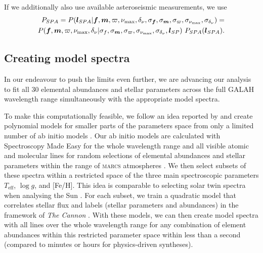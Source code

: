 \documentclass[
  journal=pasa,
  manuscript=research-paper, %
  year=2021,
  volume=37,
]{cup-journal}
\newcommand{\Teff}{$T_\mathrm{eff}$\xspace}
\newcommand{\logg}{$\log g$\xspace}
\begin{document}
If we additionally also use available asteroseismic measurements, we use
\begin{align}\label{eq:posterior_spa}
    P_{SPA} = P ( \boldsymbol{l}_{SPA} \vert {\boldsymbol{f}}, {\boldsymbol{m}}, \varpi, {\nu_\text{max}}, {\delta_\nu}, \sigma_{\boldsymbol{f}} , \sigma_{\boldsymbol{m}}, \sigma_\varpi, \sigma_{\nu_\text{max}}, \sigma_{\delta_\nu}) = \notag\\
    P ( {\boldsymbol{f}}, {\boldsymbol{m}}, \varpi, {\nu_\text{max}}, {\delta_\nu} \vert \sigma_{f}, \sigma_{\boldsymbol{m}}, \sigma_\varpi, \sigma_{\nu_\text{max}}, \sigma_{\delta_\nu}, \boldsymbol{l}_{SP} ) ~ P_{SPA} ( \boldsymbol{l}_{SPA}).
\end{align}

\subsection{Creating model spectra} \label{subsec:model_spectra}

In our endeavour to push the limits even further, we are advancing our analysis to fit all 30 elemental abundances and stellar parameters across the full GALAH wavelength range simultaneously with the appropriate model spectra.

To make this computationally feasible, we follow an idea reported by \citet{Rix2016} and create polynomial models for smaller parts of the parameters space from only a limited number of ab initio models \citep[see also][]{Ting2016b}. Our ab initio models are calculated with Spectroscopy Made Easy \citep[\textsc{sme}][]{Valenti1996,Piskunov2017} for the whole wavelength range and all visible atomic and molecular lines for random selections of elemental abundances and stellar parameters within the range of \textsc{marcs} atmospheres \citep{Gustafsson2008}. We then select subsets of these spectra within a restricted space of the three main spectroscopic parameters \Teff, \logg, and [Fe/H]. This idea is comparable to selecting solar twin spectra when analysing the Sun \citep[see e.g.][who applied this idea with tremendous success in the opposite direction]{Nissen2015}. For each subset, we train a quadratic model that correlates stellar flux and labels (stellar parameters and abundances) in the framework of \textit{The Cannon} \citep{Ness2015, Casey2016}. With these models, we can then create model spectra with all lines over the whole wavelength range for any combination of element abundances within this restricted parameter space within less than a second (compared to minutes or hours for physics-driven syntheses). 
\end{document}
